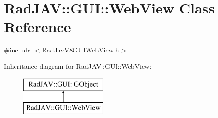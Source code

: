 \hypertarget{class_rad_j_a_v_1_1_g_u_i_1_1_web_view}{}\section{Rad\+J\+AV\+:\+:G\+UI\+:\+:Web\+View Class Reference}
\label{class_rad_j_a_v_1_1_g_u_i_1_1_web_view}


{\ttfamily \#include $<$Rad\+Jav\+V8\+G\+U\+I\+Web\+View.\+h$>$}

Inheritance diagram for Rad\+J\+AV\+:\+:G\+UI\+:\+:Web\+View\+:\begin{figure}[H]
\begin{center}
\leavevmode
\includegraphics[height=2.000000cm]{class_rad_j_a_v_1_1_g_u_i_1_1_web_view}
\end{center}
\end{figure}
